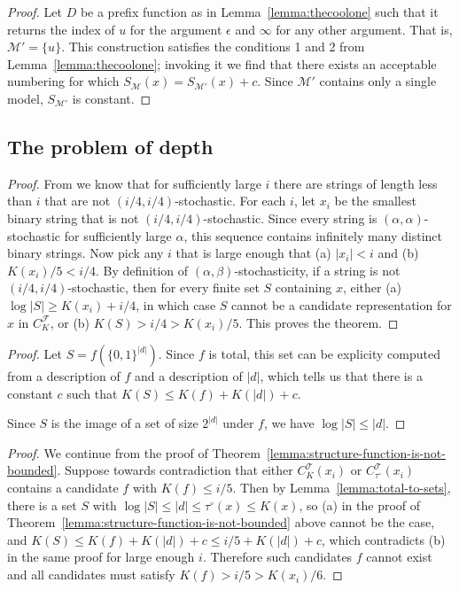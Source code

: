 \documentclass{style/llncs}
\newcommand{\M}{\mathscr M}
\newcommand{\T}{\mathscr T}
\newcommand{\F}{\mathscr F}
\newcommand{\s}{S}
\begin{document}
\underfitting*

\begin{proof}
Let $D$ be a prefix function as in Lemma~\ref{lemma:thecoolone} such that it returns the index of $u$ for the argument $\epsilon$ and $\infty$ for any other argument. That is, $\M' = \{u\}$. This construction satisfies the conditions 1 and 2 from Lemma~\ref{lemma:thecoolone}; invoking it we find that there exists an acceptable numbering for which $\s_\M(x) = \s_{\M'}(x) + c$. Since $\M'$ contains only a single model, $\s_{\M'}$ is constant.
\end{proof}

\subsection{The problem of depth}

\nonstochastic*

\begin{proof}
From \cite[Proposition~I.3 (b)]{gacs2001algorithmic} we know that for sufficiently large $i$ there are strings of length less than $i$ that are not $(i/4, i/4)$-stochastic. For each $i$, let $x_i$ be the smallest binary string that is not $(i/4, i/4)$-stochastic. Since every string is $(\alpha,\alpha)$-stochastic for sufficiently large $\alpha$, this sequence contains infinitely many distinct binary strings. Now pick any $i$ that is large enough that (a) $|x_i|<i$ and (b) $K(x_i)/5 < i/4$. By definition of $(\alpha,\beta)$-stochasticity, if a string is not $(i/4,i/4)$-stochastic, then for every finite set $S$ containing $x$, either (a) $\log|S|\ge K(x_i)+i/4$, in which case $S$ cannot be a candidate representation for $x$ in $C^\F_K$, or (b) $K(S)>i/4>K(x_i)/5$. This proves the theorem.
\end{proof}

\vitanyi*
\begin{proof}
Let $S = f\left(\{0,1\}^{|d|}\right)$. Since $f$ is total, this set can be explicity computed from a description of $f$ and a description of $|d|$, which tells us that there is a constant $c$ such that $K(S) \leq K(f) + K(|d|) + c$. 

Since $S$ is the image of a set of size $2^{|d|}$ under $f$, we have $\log |S| \leq |d|$.
\end{proof}

\dogfood*
\begin{proof}
We continue from the proof of Theorem~\ref{lemma:structure-function-is-not-bounded}. Suppose towards contradiction that either $C^\T_K(x_i)$ or $C^\T_{\tau^\circ}(x_i)$ contains a candidate $f$ with $K(f)\le i/5$. Then by Lemma~\ref{lemma:total-to-sets}, there is a set $S$ with $\log|S|\le|d|\le\tau^\circ(x)\le K(x)$, so (a) in the proof of Theorem~\ref{lemma:structure-function-is-not-bounded} above cannot be the case, and $K(S)\le K(f)+K(|d|)+c\le i/5+K(|d|)+c$, which contradicts (b) in the same proof for large enough $i$. Therefore such candidates $f$ cannot exist and all candidates must satisfy $K(f)>i/5>K(x_i)/6$.
\end{proof}
\end{document}
